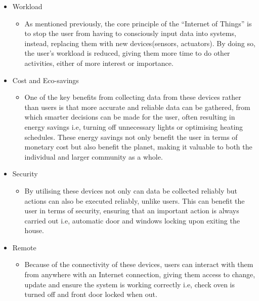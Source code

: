 \begin{itemize}
	\item Workload 
	\begin{itemize}
		\item As mentioned previously, the core principle of the ``Internet of Things'' is to stop the user from having to consciously input data into systems, instead, replacing them with new devices(sensors, actuators). By doing so, the user's workload is reduced, giving them more time to do other activities, either of more interest or importance. 
	\end{itemize}
	\item Cost and Eco-savings
	\begin{itemize}
		\item One of the key benefits from collecting data from these devices rather than users is that more accurate and reliable data can be gathered, from which smarter decisions can be made for the user, often resulting in energy savings i.e, turning off unnecessary lights or optimising heating schedules. These energy savings not only benefit the user in terms of monetary cost but also benefit the planet, making it valuable to both the individual and larger community as a whole.
	\end{itemize}
	\item Security
	\begin{itemize}
		\item By utilising these devices not only can data be collected reliably but actions can also be executed reliably, unlike users. This can benefit the user in terms of security, ensuring that an important action is always carried out i.e, automatic door and windows locking upon exiting the house.
	\end{itemize}
	\item Remote
	\begin{itemize}
		\item Because of the connectivity of these devices, users can interact with them from anywhere with an Internet connection, giving them access to change, update and ensure the system is working correctly i.e, check oven is turned off and front door locked when out.
	\end{itemize}
\end{itemize}




